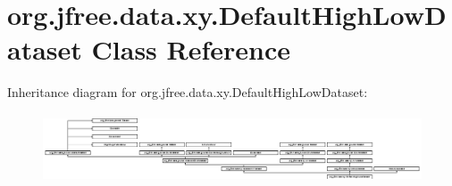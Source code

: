 \hypertarget{classorg_1_1jfree_1_1data_1_1xy_1_1_default_high_low_dataset}{}\section{org.\+jfree.\+data.\+xy.\+Default\+High\+Low\+Dataset Class Reference}
\label{classorg_1_1jfree_1_1data_1_1xy_1_1_default_high_low_dataset}
Inheritance diagram for org.\+jfree.\+data.\+xy.\+Default\+High\+Low\+Dataset\+:\begin{figure}[H]
\begin{center}
\leavevmode
\includegraphics[height=2.051282cm]{classorg_1_1jfree_1_1data_1_1xy_1_1_default_high_low_dataset}
\end{center}
\end{figure}
